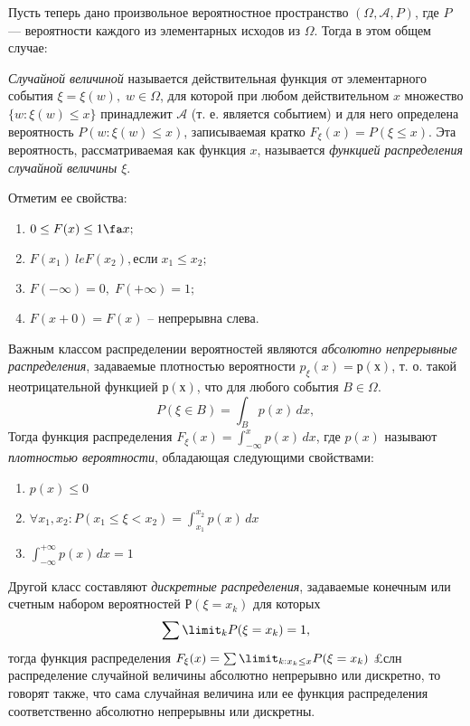 Пусть теперь дано произвольное вероятностное пространство $(\Omega,\mathcal A, P)$, где $P$ --- вероятности каждого из элементарных исходов из $\Omega$. Тогда в этом общем случае:
\begin{defn}
\textit{Случайной величиной} называется действительная функция от элементарного события $\xi = \xi(w), \; w\in\Omega$, для которой при любом действительном $x$ множество $\{w: \xi(w) \le x\}$ принадлежит $\mathcal A$ (т. е. является событием) и для него определена вероятность $P(w: \xi(w) \le x)$, записываемая кратко $F_\xi(x)=P(\xi \le x)$. Эта вероятность, рассматриваемая как функция $x$, называется \textit{функцией распределения случайной величины $\xi$}.

Отметим ее свойства:
\begin{enumerate}
\item 
$0 \le F(x) \le 1 \fa x;$ 
\item
$F(x_1) \ le F(x_2), \text{если}\; x_1\le x_2;$
\item
$F(-\infty)=0, \; F(+\infty)=1;$
\item
$F(x+0)=F(x)$ -- непрерывна слева.
\end{enumerate}
Важным классом распределении вероятностей являются \textit{абсолютно непрерывные распределения}, задаваемые плотностью вероятности $p_\xi(x) = р(х)$, т. о. такой неотрицательной функцией $р(х)$, что для любого события $B\in\Omega$.
$$
P(\xi \in B)=\int_B p(x)\,dx,
$$
Тогда функция распределения $F_\xi(x)=\int_{-\infty}^{x}p(x)\,dx$, где $p(x)$ называют \textit{плотностью вероятности}, обладающая следующими свойствами:
\begin{enumerate}
\item 
$p(x)\le 0$
\item 
$\forall x_1,x_2: P(x_1\le\xi<x_2)=\int_{x_1}^{x_2}p(x)\,dx$
\item
$\int_{-\infty}^{+\infty}p(x)\,dx=1$
\end{enumerate}

Другой класс составляют \textit{дискретные распределения}, задаваемые конечным или счетным набором вероятностей $Р(\xi=x_k)$ для которых
$$
\sum\limit_k P(\xi=x_k)=1,
$$
тогда функция распределения $F_\xi(x)=\sum\limit_{k: x_k \le x} P(\xi=x_k)$
£слн распределение случайной величины абсолютно непрерывно или дискретно, то говорят также, что сама случайная величина или ее функция распределения соответственно абсолютно непрерывны или дискретны.

























\end{defn}
